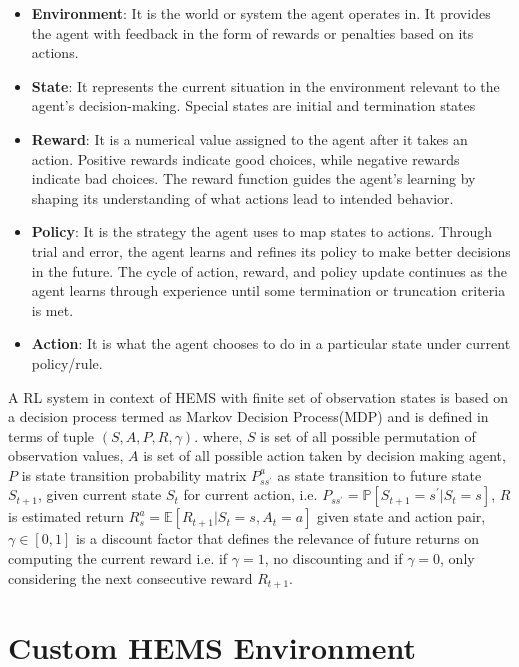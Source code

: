 \begin{large}
\begin{itemize}
	\item{\textbf{Environment}: It is the world or system the agent operates in. It provides the agent with feedback in the form of rewards or penalties based on its actions.}
	\item{\textbf{State}: It represents the current situation in the environment relevant to the agent's decision-making. Special states are initial and termination states}
	\item{\textbf{Reward}: It is a numerical value assigned to the agent after it takes an action. Positive rewards indicate good choices, while negative rewards indicate bad choices. The reward function guides the agent's learning by shaping its understanding of what actions lead to intended behavior.}
	\item{\textbf{Policy}: It is the strategy the agent uses to map states to actions. Through trial and error, the agent learns and refines its policy to make better decisions in the future. The cycle of action, reward, and policy update continues as the agent learns through experience until some termination or truncation criteria is met.}
	\item{\textbf{Action}: It is what the agent chooses to do in a particular state under current policy/rule.}
\end{itemize}

A RL system in context of HEMS with finite set of observation states is based on a decision process termed as Markov Decision Process(MDP) and is defined in terms of tuple $(S, A, P, R, \gamma)$. where, $S$ is set of all possible permutation of observation values, $A$ is set of all possible action taken by decision making agent, $P$ is state transition probability matrix $P_{ss^{'}}^{a}$ as state transition to future state $S_{t+1}$, given current state $S_t$ for current action, i.e. $P_{ss^{'}} = \mathbb{P}[S_{t+1} = s^{'} | S_t = s]$, $R$ is estimated return $R_{s}^{a} = \mathbb{E}[R_{t+1} |S_{t}=s, A_{t}=a]$ given state and action pair, $\gamma \in [0,1]$ is a discount factor that defines the relevance of future returns on computing the current reward i.e. if $\gamma =1$, no discounting and if $\gamma=0$, only considering the next consecutive reward $R_{t+1}$. \\


\section{Custom HEMS Environment}


\end{large}
